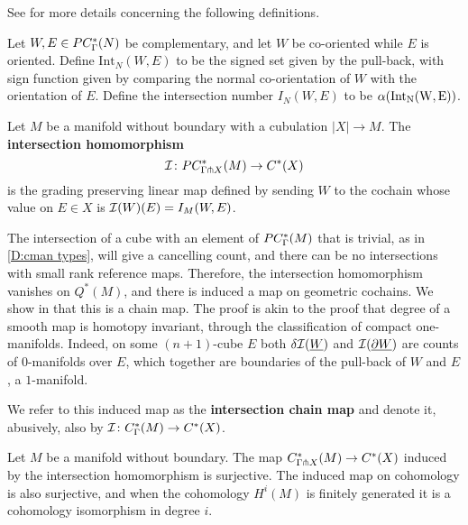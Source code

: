 See \cite[Section 6.5]{medina2022foundations} for more details concerning the following definitions.

\begin{definition}\label{D:intersection number}
	Let $W, E \in PC_\Gamma^*({N})$ be complementary, and let $W$ be co-oriented while $E$ is oriented.
	Define $\mathrm{Int}_N(W, E)$ to be the signed set given by the pull-back, with sign function given by comparing the normal co-orientation of $W$ with the orientation of $E$.
	Define the intersection number $I_N(W,E)$ to be $\alpha(\rm{Int}_N(W, E))$.
\end{definition}

\begin{definition}\label{D:intersection homomorphism}
	Let $M$ be a manifold without boundary with a cubulation $|X| \to M$.
	The \textbf{intersection homomorphism}
	\begin{equation*}
		\mathcal{I} \colon PC^*_{\Gamma \pitchfork X}(M) \to C^{\ast}(X)
	\end{equation*}
	is the grading preserving linear map defined by sending $W$ to the cochain whose value on $E \in X$ is $\mathcal{I}(W)(E) = I_M(W, E)$.
\end{definition}

The intersection of a cube with an element of $PC_\Gamma^*(M)$ that is trivial, as in \cref{D:cman types}, will give a cancelling count, and there can be no intersections with small rank reference maps.
Therefore, the intersection homomorphism vanishes on $Q^*(M)$, and there is induced a map on geometric cochains.
We show in \cite[Proposition 6.14]{medina2022foundations} that this is a chain map.
The proof is akin to the proof that degree of a smooth map is homotopy invariant, through the classification of compact one-manifolds.
Indeed, on some $(n+1)$-cube $E$ both $\delta \mathcal{I}(\underline{W})$ and $\mathcal{I}(\underline{\partial W})$ are counts of $0$-manifolds over $E$, which together are boundaries of the pull-back of $W$ and $E$, a $1$-manifold.

We refer to this induced map as the \textbf{intersection chain map} and denote it, abusively, also by $\mathcal{I} \colon C_\Gamma^*(M)\to C^*(X)$.

\begin{theorem}\label{T:stokes}
	Let $M$ be a manifold without boundary.
	The map $C^*_{\Gamma \pitchfork X}(M) \to C^{\ast}(X)$ induced by the intersection homomorphism is surjective.
	The induced map on cohomology is also surjective, and when the cohomology $H^i(M)$ is finitely generated it is a cohomology isomorphism in degree $i$.
\end{theorem}

